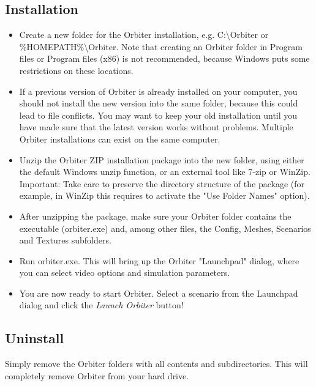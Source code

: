 \documentclass[Orbiter User Manual.tex]{subfiles}
\begin{document}
\subsection{Installation}
\begin{itemize}
\item Create a new folder for the Orbiter installation, e.g. C:\textbackslash Orbiter or \%HOMEPATH\%\textbackslash Orbiter. Note that creating an Orbiter folder in Program files or Program files (x86) is not recommended, because Windows puts some restrictions on these locations.
\item If a previous version of Orbiter is already installed on your computer, you should not install the new version into the same folder, because this could lead to file conflicts. You may want to keep your old installation until you have made sure that the latest version works without problems. Multiple Orbiter installations can exist on the same computer.
\item Unzip the Orbiter ZIP installation package into the new folder, using either the default Windows unzip function, or an external tool like 7-zip or WinZip. Important: Take care to preserve the directory structure of the package (for example, in WinZip this requires to activate the "Use Folder Names" option).
\item After unzipping the package, make sure your Orbiter folder contains the executable (orbiter.exe) and, among other files, the Config, Meshes, Scenarios and Textures subfolders.
\item Run orbiter.exe. This will bring up the Orbiter "Launchpad" dialog, where you can select video options and simulation parameters.
\item You are now ready to start Orbiter. Select a scenario from the Launchpad dialog and click the \textit{Launch Orbiter} button!
\end{itemize}

\noindent
{}

\subsection{Uninstall}
Simply remove the Orbiter folders with all contents and subdirectories. This will completely remove Orbiter from your hard drive.
\end{document}
